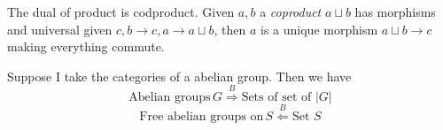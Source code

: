 \begin{definition}
	The dual of product is codproduct. Given $a,b$ a \textit{coproduct} $a \sqcup b$ has morphisms
	and universal
	given $c, b \to c, a \to a \sqcup b$, then $a$ is a unique morphism $a \sqcup b \to c$ making everything commute. 
	\begin{center}
	\end{center}
\end{definition}

\begin{example}
	Suppose I take the categories of a abelian group. Then we have
	\[ \text{Abelian groups} \,G \stackrel{B}{\Longrightarrow} \text{Sets of set of $|G|$}\]
	\[ \text{Free abelian groups on} \,S \stackrel{B}{\Longleftarrow} \text{Set $S$}\]
\end{example}


